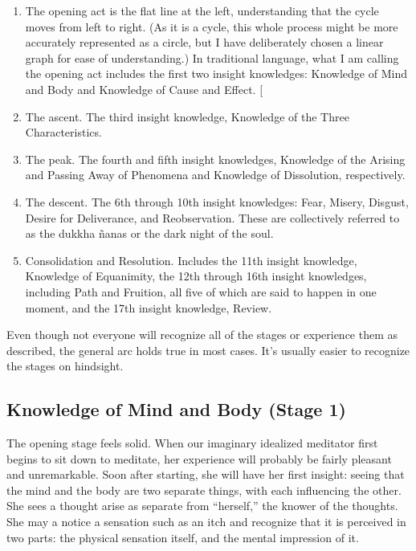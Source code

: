 \documentclass[a5paper,10pt,english]{book}
\begin{document}
\noindent{}
\begin{enumerate}
%
\item {} 
\sphinxAtStartPar
The opening act is the flat line at the left, understanding that the
cycle moves from left to right. (As it is a cycle, this whole process
might be more accurately represented as a circle, but I have
deliberately chosen a linear graph for ease of understanding.) In
traditional language, what I am calling the opening act includes the
first two insight knowledges: Knowledge of Mind and Body and
Knowledge of Cause and Effect.
{[}\sphinxurl{http://www.accesstoinsight.org/lib/authors/mahasi/progress.html}{]}

\item {} 
\sphinxAtStartPar
The ascent. The third insight knowledge, Knowledge of the Three
Characteristics.

\item {} 
\sphinxAtStartPar
The peak. The fourth and fifth insight knowledges, Knowledge of the
Arising and Passing Away of Phenomena and Knowledge of Dissolution,
respectively.

\item {} 
\sphinxAtStartPar
The descent. The 6th through 10th insight knowledges: Fear, Misery,
Disgust, Desire for Deliverance, and Re\sphinxhyphen{}observation. These are
collectively referred to as the dukkha ñanas or the dark night of the
soul.

\item {} 
\sphinxAtStartPar
Consolidation and Resolution. Includes the 11th insight knowledge,
Knowledge of Equanimity, the 12th through 16th insight knowledges,
including Path and Fruition, all five of which are said to happen in
one moment, and the 17th insight knowledge,
Review.

\end{enumerate}

\sphinxAtStartPar
Even though not everyone will recognize all of the stages or experience
them as described, the general arc holds true in most cases. It’s
usually easier to recognize the stages on hindsight.


\subsection{Knowledge of Mind and Body (Stage 1)}
\label{\detokenize{main-2:knowledge-of-mind-and-body-stage-1}}
\sphinxAtStartPar
The opening stage feels solid. When our imaginary idealized meditator
first begins to sit down to meditate, her experience will probably be
fairly pleasant and unremarkable. Soon after starting, she will have her
first insight: seeing that the mind and the body are two separate
things, with each influencing the other. She sees a thought arise as
separate from “herself,” the knower of the thoughts. She may a notice a
sensation such as an itch and recognize that it is perceived in two
parts: the physical sensation itself, and the mental impression of it.
\end{document}
